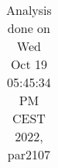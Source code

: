 \begin{table}[h]
\begin{center}
\begin{tabular}{|l|c|c|c|c|c|}
\hline
\hline
\end{tabular}
\end{center}
\caption{ Analysis done on Wed Oct 19 05:45:34 PM CEST 2022, par2107}
\end{table}
